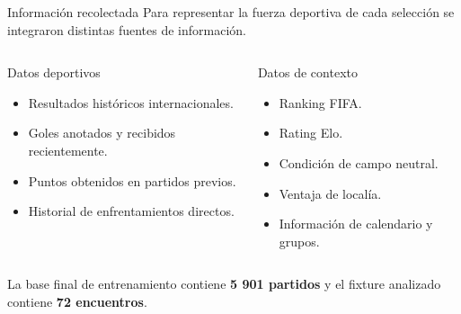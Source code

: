 \documentclass[aspectratio=169]{beamer}
\begin{document}
\begin{frame}{Información recolectada}
\justifying
Para representar la fuerza deportiva de cada selección se integraron distintas fuentes de información.

\vspace{0.25cm}
\begin{columns}[T]
\begin{block}{Datos deportivos}
\begin{itemize}
    \item Resultados históricos internacionales.
    \item Goles anotados y recibidos recientemente.
    \item Puntos obtenidos en partidos previos.
    \item Historial de enfrentamientos directos.
\end{itemize}
\end{block}

\begin{block}{Datos de contexto}
\begin{itemize}
    \item Ranking FIFA.
    \item Rating Elo.
    \item Condición de campo neutral.
    \item Ventaja de localía.
    \item Información de calendario y grupos.
\end{itemize}
\end{block}
\end{columns}

\vspace{0.2cm}
La base final de entrenamiento contiene \textbf{5 901 partidos} y el fixture analizado contiene \textbf{72 encuentros}.
\end{frame}
\end{document}
